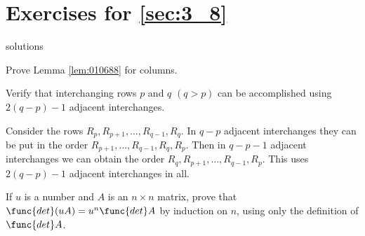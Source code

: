 \section*{Exercises for \ref{sec:3_8}}

\begin{Filesave}{solutions}
\end{Filesave}

\begin{multicols}{2}
\begin{ex}
Prove Lemma \ref{lem:010688} for columns.
\end{ex}

\begin{ex}
Verify that interchanging rows $p$ and $q$ $(q > p)$ can be accomplished using $2(q - p) - 1$ adjacent interchanges.

\begin{sol}
Consider the rows $R_{p}, R_{p+1}, \dots , R_{q-1}, R_{q}$. In $q - p$ adjacent interchanges they can be put in the order $R_{p+1}, \dots , R_{q-1}, R_{q}, R_{p}$. Then in $q - p - 1$ adjacent interchanges we can obtain the order $R_{q}, R_{p+1}, \dots , R_{q-1}, R_{p}$. This uses $2(q - p) -1$ adjacent interchanges in all.
\end{sol}
\end{ex}



\begin{ex}
If $u$ is a number and $A$ is an $n \times n$ matrix, prove that $\func{det}(uA) = u^{n} \func{det }A$ by induction on $n$, using only the definition of $\func{det }A$.
\end{ex}

\end{multicols}


